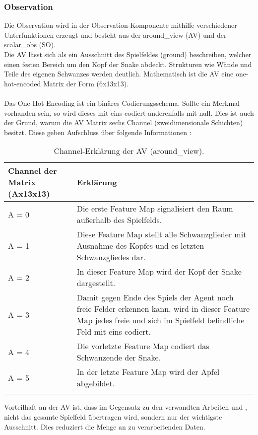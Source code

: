 \subsubsection{Observation} \label{subsubsec:Konzept_Observation}
Die Observation wird in der Observation-Komponente mithilfe verschiedener Unterfunktionen erzeugt und besteht aus der around\_view (AV) und der scalar\_obs (SO).\\
Die AV lässt sich als ein Ausschnitt des Spielfeldes (ground) beschreiben, welcher einen festen Bereich um den Kopf der Snake abdeckt.
Strukturen wie Wände und Teile des eigenen Schwanzes werden deutlich. Mathematisch ist die AV eine one-hot-encoded Matrix der Form (6x13x13).\\
\\Das One-Hot-Encoding ist ein binäres Codierungsschema. Sollte ein Merkmal vorhanden sein, so wird dieses mit eins codiert anderenfalls mit null. \cite[S. 359 f.]{DRL_Lapan}
Dies ist auch der Grund, warum die AV Matrix sechs Channel (zweidimensionale Schichten) besitzt. Diese geben Aufschluss über folgende Informationen :
\begin{longtable}[h]{|p{4cm}|p{\linewidth - 5cm}|}
	\hline
	Channel der Matrix (Ax13x13) & Erklärung \\
	\hline
	A = 0 & Die erste Feature Map signalisiert den Raum außerhalb des Spielfelds.\\
	\hline
	A = 1 & Diese Feature Map stellt alle Schwanzglieder mit Ausnahme des Kopfes und es letzten Schwanzgliedes dar. \\
	\hline
	A = 2 & In dieser Feature Map wird der Kopf der Snake dargestellt. \\
	\hline
	A = 3 & Damit gegen Ende des Spiels der Agent noch freie Felder erkennen kann, wird in dieser Feature Map jedes freie und sich im Spielfeld befindliche Feld mit eins codiert. \\
	\hline
	A = 4 & Die vorletzte Feature Map codiert das Schwanzende der Snake. \\
	\hline
	A = 5 & In der letzte Feature Map wird der Apfel abgebildet. \\
	\hline
	\caption[Around\_View - Erklärung der Channels]{Channel-Erklärung der AV (around\_view).}
	\label{tab:Konzept_around_view} 
\end{longtable}
Vorteilhaft an der AV ist, dass im Gegensatz zu den verwandten Arbeiten \citep{Autonomous_Agents_in_Snake_Game_via_DRL} und \citep{UAV}, nicht das gesamte Spielfeld übertragen wird, sondern nur der wichtigste Ausschnitt. Dies reduziert die Menge an zu verarbeitenden Daten.
